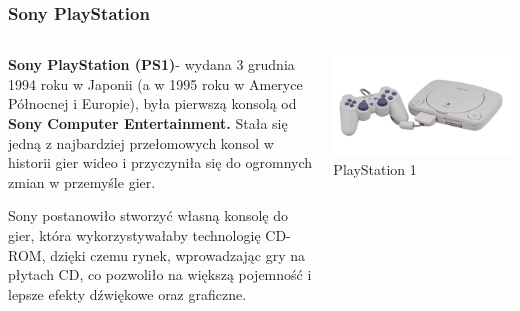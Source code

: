 \documentclass[8pt]{beamer}
\begin{document}
\begin{frame}
\frametitle{Sony PlayStation}
\begin{columns}

\begin{column}{0.6\textwidth}
\textbf {Sony PlayStation (PS1)}- wydana 3 grudnia 1994 roku w Japonii (a w 1995 roku w Ameryce Północnej i Europie), była pierwszą konsolą od \textbf {Sony Computer Entertainment.} Stała się jedną z najbardziej przełomowych konsol w historii gier wideo i przyczyniła się do ogromnych zmian w przemyśle gier.

\vspace{0.5em}

Sony postanowiło stworzyć własną konsolę do gier, która wykorzystywałaby technologię CD-ROM, dzięki czemu rynek, wprowadzając gry na płytach CD, co pozwoliło na większą pojemność i lepsze efekty dźwiękowe oraz graficzne.
\end{column}

\begin{column}{0.35\textwidth}
        \centering
        \includegraphics[width=\textwidth]{ps1.jpg} 
        {\small PlayStation 1} 
    \end{column}
\end{columns}

\end{frame}
\end{document}
